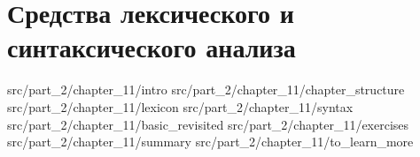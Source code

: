 \chapter{Средства лексического и синтаксического анализа}

 {src/part_2/chapter_11/intro}
 {src/part_2/chapter_11/chapter_structure}
 {src/part_2/chapter_11/lexicon}
 {src/part_2/chapter_11/syntax}
 {src/part_2/chapter_11/basic_revisited}
 {src/part_2/chapter_11/exercises}
 {src/part_2/chapter_11/summary}
 {src/part_2/chapter_11/to_learn_more}